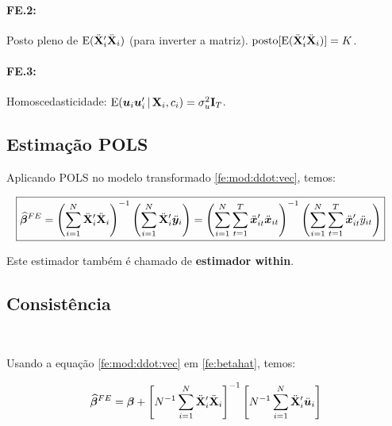 \documentclass[11pt, oneside, a4paper, article]{article}
\numberwithin{equation}{section}
\begin{document}
\paragraph{FE.2:} Posto pleno de $\text{E}( \ddot{\mathbf{X}}_{i}' \ddot{\mathbf{X}}_{i} )$ (para inverter a matriz).
$\text{posto}[ \text{E}( \ddot{\mathbf{X}}_{i}'  \ddot{\mathbf{X}}_{i} ) ]  = K$.

\paragraph{FE.3:} Homoscedasticidade:
$\text{E}( \boldsymbol{u}_{i} \boldsymbol{u}_{i}' \,|\, \mathbf{X}_{i}, c_{i}) = \sigma_{u}^{2} \mathbf{I}_{T}$.

\subsection{Estimação POLS}
\noindent
\citet[p.269]{wool-2010} 

\noindent
Aplicando POLS no modelo transformado \eqref{fe:mod:ddot:vec}, temos:

\vspace{-1 em}
\begin{align} \label{fe:betahat}
\Aboxed{
\betavechat^{FE} =
\left( \sum_{i=1}^{N} \ddot{\Xmat}_{i}' \ddot{\Xmat}_{i} \right)^{-1}
\left( \sum_{i=1}^{N} \ddot{\Xmat}_{i}' \ddot{\yvec}_{i} \right)
=
\left( \sum_{i=1}^{N} \sum_{t=1}^{T} \ddot{\xvec}_{it}' \ddot{\xvec}_{it} \right)^{-1}
\left( \sum_{i=1}^{N} \sum_{t=1}^{T} \ddot{\xvec}_{it}' \ddot{y}_{it} \right)
}
\end{align}

\noindent
Este estimador também é chamado de \textbf{estimador within}.

\subsection{Consistência}
\noindent
\citet[sec.10.5.1 -- Consistency of the Fixed Effects Estimator, p.265--269]{wool-2010} \\
\citet[p.269]{wool-2010} 

\vspace{1 em}
\noindent
Usando a equação \eqref{fe:mod:ddot:vec} em \eqref{fe:betahat}, temos:

\vspace{-1 em}
\begin{align} \label{fe:betahat:2}
\widehat{\boldsymbol{\beta}}^{FE} =
\boldsymbol{\beta} +
\left[ N^{-1} \sum_{i=1}^{N} \ddot{\mathbf{X}}_{i}' \ddot{\mathbf{X}}_{i} \right]^{-1}
\left[ N^{-1} \sum_{i=1}^{N} \ddot{\mathbf{X}}_{i}' \ddot{\boldsymbol{u}}_{i} \right]
\end{align}
\end{document}
